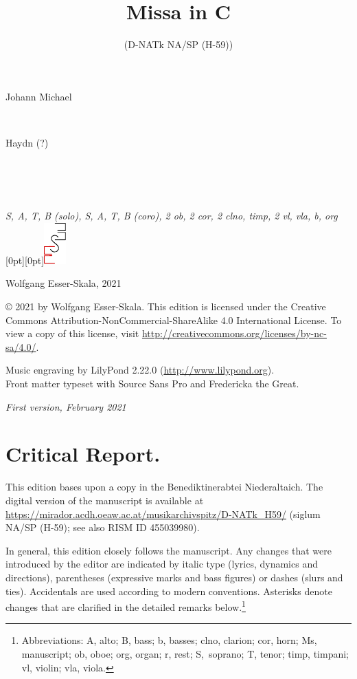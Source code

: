 \documentclass[parskip=full]{scrreprt}
\makeatletter
\DeclareRobustCommand{\sbseries}{\fontseries{sb}\selectfont}
\newcommand\fancytitlehead{
	\headingfont%
	\fontsize{80}{80}\selectfont\textcolor{black!80}{\@ifundefined{@shortname}{\@lastname}{\@shortname}.}\\[15pt]%
	\fontsize{60}{60}\selectfont\@ifundefined{@shorttitle}{\@title}{\@shorttitle}.%
}
\def\firstname#1{\def\@firstname{#1}}
\def\lastname#1{\def\@lastname{#1}}
\def\instrumentation#1{\def\@instrumentation{#1}}
\def\maketitle{%
\begin{titlepage}%
	\Large%
	{\@titlehead}%
	\vfill%
	{\strut\@firstname}\\%
	{\sbseries\color{oldred}\strut\@lastname}\\%
	{\strut\@namesuffix}%
	\vfill%
	{\sbseries\@title}\\%
	{\@subtitle}\\[\baselineskip]%
	{\itshape\@instrumentation}%
	\vfill%
	{\itshape\@parts}\hspace*{\fill}\raisebox{0pt}[0pt][0pt]{\includegraphics{ees_logo}}%
\end{titlepage}%
}
\newif\ifprintreport\printreportfalse
\makeatother
\begin{document}
\frenchspacing

\titlehead{\fancytitlehead}
\firstname{Johann Michael}
\lastname{Haydn (?)}
\title{Missa in C}
\subtitle{(D-NATk NA/SP (H-59))}
\instrumentation{S, A, T, B (solo), S, A, T, B (coro), 2 ob, 2 cor, 2 clno, timp, 2 vl, vla, b, org}
\maketitle


\thispagestyle{empty}

\vspace*{\fill}

\hspace*{1em}Wolfgang Esser-Skala, 2021

© 2021 by Wolfgang Esser-Skala. This edition is licensed under the Creative Commons Attribution-NonCommercial-ShareAlike 4.0 International License. To view a copy of this license, visit \url{http://creativecommons.org/licenses/by-nc-sa/4.0/}. 

Music engraving by LilyPond 2.22.0 (\url{http://www.lilypond.org}).\\
Front matter typeset with Source Sans Pro and Fredericka the Great.

\textit{First version, February 2021}

\vspace*{2cm}

\ifprintreport
\chapter*{Critical Report.}

This edition bases upon a copy in the Benediktinerabtei Niederaltaich. The digital version of the manuscript is available at \url{https://mirador.acdh.oeaw.ac.at/musikarchivspitz/D-NATk_H59/} (siglum NA/SP (H-59); see also RISM ID 455039980).

In general, this edition closely follows the manuscript. Any changes that were introduced by the editor are indicated by italic type (lyrics, dynamics and directions), parentheses (expressive marks and bass figures) or dashes (slurs and ties). Accidentals are used according to modern conventions. Asterisks denote changes that are clarified in the detailed remarks below.\footnote{Abbreviations: A, alto; B, bass; b, basses; clno, clarion; cor, horn; Ms, manuscript; ob, oboe; org, organ; r, rest; S,~soprano; T, tenor; timp, timpani; vl, violin; vla, viola.}
\end{document}
